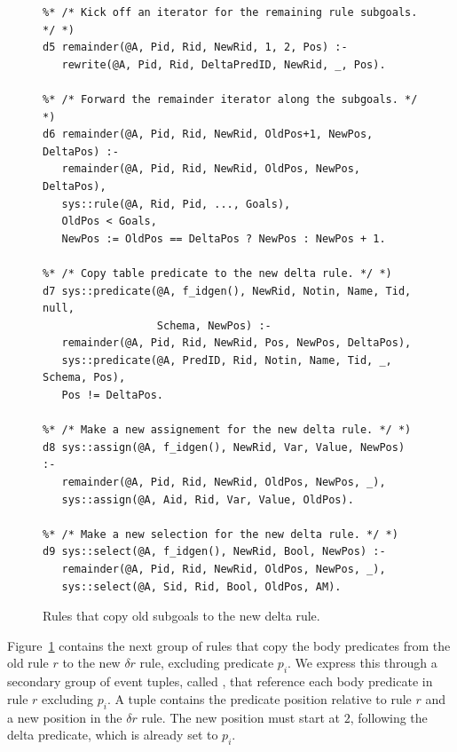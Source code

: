 \begin{figure}[!t]
\ssp
\centering
\begin{lstlisting}
%* /* Kick off an iterator for the remaining rule subgoals. */ *)
d5 remainder(@A, Pid, Rid, NewRid, 1, 2, Pos) :-
   rewrite(@A, Pid, Rid, DeltaPredID, NewRid, _, Pos).

%* /* Forward the remainder iterator along the subgoals. */ *)
d6 remainder(@A, Pid, Rid, NewRid, OldPos+1, NewPos, DeltaPos) :-
   remainder(@A, Pid, Rid, NewRid, OldPos, NewPos, DeltaPos),
   sys::rule(@A, Rid, Pid, ..., Goals),
   OldPos < Goals,
   NewPos := OldPos == DeltaPos ? NewPos : NewPos + 1.

%* /* Copy table predicate to the new delta rule. */ *)
d7 sys::predicate(@A, f_idgen(), NewRid, Notin, Name, Tid, null, 
                  Schema, NewPos) :-
   remainder(@A, Pid, Rid, NewRid, Pos, NewPos, DeltaPos),
   sys::predicate(@A, PredID, Rid, Notin, Name, Tid, _, Schema, Pos),
   Pos != DeltaPos.

%* /* Make a new assignement for the new delta rule. */ *)
d8 sys::assign(@A, f_idgen(), NewRid, Var, Value, NewPos) :-
   remainder(@A, Pid, Rid, NewRid, OldPos, NewPos, _),
   sys::assign(@A, Aid, Rid, Var, Value, OldPos).

%* /* Make a new selection for the new delta rule. */ *)
d9 sys::select(@A, f_idgen(), NewRid, Bool, NewPos) :-
   remainder(@A, Pid, Rid, NewRid, OldPos, NewPos, _),
   sys::select(@A, Sid, Rid, Bool, OldPos, AM).

\end{lstlisting}
\caption{\label{ch:evita:fig:delta3}Rules that copy old subgoals to the new 
delta rule.}
\end{figure}

Figure~\ref{ch:evita:fig:delta3} contains the next group of rules that copy the
body predicates from the old rule $r$ to the new $\delta r$ rule, excluding
predicate $p_i$.  We express this through a secondary group of event tuples,
called , that reference each body predicate in rule $r$ excluding
$p_i$.  A  tuple contains the predicate position relative to rule 
$r$ and a new position in the $\delta r$ rule.  The new position must start at 
$2$, following the delta predicate, which is already set to $p_i$.  

